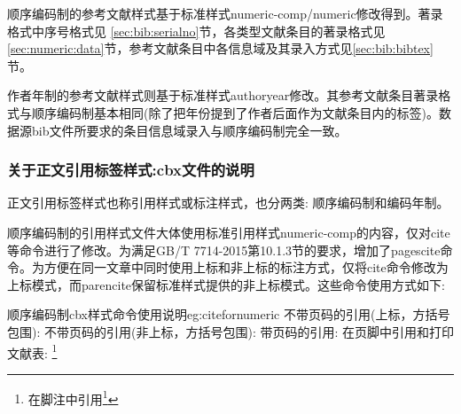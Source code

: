 顺序编码制的参考文献样式基于标准样式numeric-comp/numeric修改得到。著录格式中序号格式见
\ref{sec:bib:serialno}节，各类型文献条目的著录格式见\ref{sec:numeric:data}节，参考文献条目中各信息域及其录入方式见\ref{sec:bib:bibtex}节。

作者年制的参考文献样式则基于标准样式authoryear修改。其参考文献条目著录格式与顺序编码制基本相同(除了把年份提到了作者后面作为文献条目内的标签)。数据源bib文件所要求的条目信息域录入与顺序编码制完全一致。



\subsubsection{关于正文引用标签样式:cbx文件的说明}\label{sec:cbx:usage}
正文引用标签样式也称引用样式或标注样式，也分两类: 顺序编码制和编码年制。

顺序编码制的引用样式文件大体使用标准引用样式numeric-comp的内容，仅对cite等命令进行了修改。为满足GB/T 7714-2015第10.1.3节的要求，增加了pagescite命令。为方便在同一文章中同时使用上标和非上标的标注方式，仅将cite命令修改为上标模式，而parencite保留标准样式提供的非上标模式。这些命令使用方式如下:

\begin{codetex}{顺序编码制cbx样式命令使用说明}{eg:citefornumeric}
不带页码的引用(上标，方括号包围):
    \cite{Peebles2001-100-100}
不带页码的引用(非上标，方括号包围):
    \parencite{Miroslav2004--}
带页码的引用:
    \cite[见][49页]{蔡敏2006--}  \parencite[见][49页]{Miroslav2004--}
      
在页脚中引用和打印文献表:
    \footnote{在脚注中引用\footcite{赵学功2001--}}  
\end{codetex}

